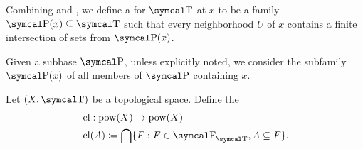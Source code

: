 \begin{definition}\label{def:topological_local_subbase}
  Combining  and , we define a  for \( \CT \) at \( x \) to be a family \( \CP(x) \subseteq \CT \) such that every neighborhood \( U \) of \( x \) contains a finite intersection of sets from \( \CP(x) \).

  Given a subbase \( \CP \), unless explicitly noted, we consider the subfamily \( \CP(x) \) of all members of \( \CP \) containing \( x \).
\end{definition}

\begin{definition}\label{def:closure_operator}\cite[33]{Engelking1989}
  Let \( (X, \CT) \) be a topological space. Define the 
  \begin{align*}
    &\Cl: \Pow(X) \to \Pow(X) \\
    &\Cl(A) \coloneqq \bigcap \{ F : F \in \CF_{\CT}, A \subseteq F \}.
  \end{align*}
\end{definition}

